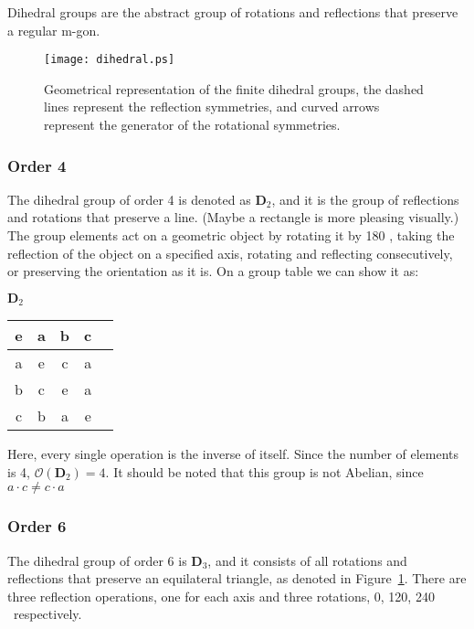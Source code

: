 Dihedral groups are the abstract group of rotations and reflections that preserve a regular m-gon.
\cite{rosen_symmetry_1995}

\begin{figure}[H]
\center
\texttt{[image: dihedral.ps]}
\caption[Geometrical representation of the finite dihedral groups]{Geometrical representation of the finite dihedral groups, the dashed lines represent the reflection symmetries, and curved arrows represent the generator of the rotational symmetries.}
\label{fig:dihedral}
\end{figure}

\subsubsection*{Order 4}
\label{d_2}
The dihedral group of order 4 is denoted as $\mathbf{D}_2$, and it is the group of reflections and rotations that preserve a line. (Maybe a rectangle is more pleasing visually.) The group elements act on a geometric object by rotating it by 180 \degree, taking the reflection of the object on a specified axis, rotating and reflecting consecutively, or preserving the orientation as it is. On a group table we can show it as:


\begin{table} [H]
\center
 $\mathbf{D}_2$\\
\begin{tabular}{c||cccc} 
      e & a & b & c \\ 
      \hline 
      a & e & c & a \\ 
      b & c & e & a \\
      c & b & a & e \\ 
     
\end{tabular} 
\end{table} 

Here, every single operation is the inverse of itself. Since the number of elements is 4, $\mathcal{O}(\mathbf{D}_2) = 4$. It should be noted that this group is not Abelian, since $ a\cdot c \neq c \cdot a $ 

\subsubsection*{Order 6}
\label{d_3}

The dihedral group of order 6 is $\mathbf{D}_3$, and it consists of all rotations and reflections that preserve an equilateral triangle, as denoted in Figure\ \ref{fig:dihedral}. There are three reflection operations, one for each axis and three rotations, 0\degree, 120\degree, 240 \degree \  respectively.

